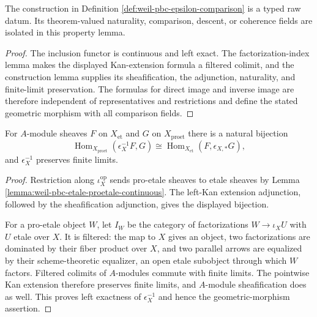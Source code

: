 \begin{lemma}
\label{lemma:weil-sf-well-defined-def-weil-pbc-epsilon-comparison}
The construction in Definition \ref{def:weil-pbc-epsilon-comparison} is a typed raw datum.  Its theorem-valued naturality, comparison, descent, or coherence fields are isolated in this property lemma.
\end{lemma}
\begin{proof}
The inclusion functor is continuous and left exact.  The factorization-index
lemma makes the displayed Kan-extension formula a filtered colimit, and the
construction lemma supplies its sheafification, the adjunction, naturality,
and finite-limit preservation.  The formulas for direct image and inverse
image are therefore independent of representatives and restrictions and
define the stated geometric morphism with all comparison fields.
\end{proof}
\begin{lemma}
\label{lemma:weil-pbc-epsilon-geometric-morphism}
For $A$-module sheaves $F$ on $X_{\mathrm{et}}$ and $G$ on
$X_{\mathrm{proet}}$ there is a natural bijection
\[
 \operatorname{Hom}_{X_{\mathrm{proet}}}(\epsilon_X^{-1}F,G)
 \cong
 \operatorname{Hom}_{X_{\mathrm{et}}}(F,\epsilon_{X,*}G),
\]
and $\epsilon_X^{-1}$ preserves finite limits.
\end{lemma}
\begin{proof}

Restriction along $\iota_X^{\mathrm{op}}$ sends pro-etale sheaves to etale
sheaves by Lemma \ref{lemma:weil-pbc-etale-proetale-continuous}.  The left-Kan
extension adjunction, followed by the sheafification adjunction, gives the
displayed bijection.

For a pro-etale object $W$, let $I_W$ be the category of factorizations
$W\to\iota_XU$ with $U$ etale over $X$.  It is filtered: the map to $X$
gives an object, two factorizations are dominated by their fiber product over
$X$, and two parallel arrows are equalized by their scheme-theoretic
equalizer, an open etale subobject through which $W$ factors.  Filtered
colimits of $A$-modules commute with finite limits.  The pointwise Kan
extension therefore preserves finite limits, and $A$-module sheafification
does as well.  This proves left exactness of $\epsilon_X^{-1}$ and hence the
geometric-morphism assertion.
\end{proof}

